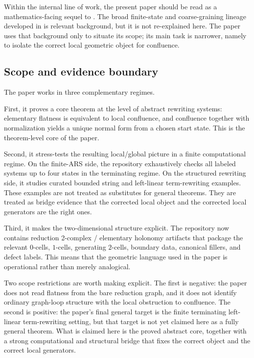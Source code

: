 \documentclass[11pt]{article}
\numberwithin{equation}{section}
\theoremstyle{definition}
\theoremstyle{remark}
\begin{document}
Within the internal line of work, the present paper should be read as a mathematics-facing sequel to \cite{Tsiokos2026CountStone}. The broad finite-state and coarse-graining lineage developed in \cite{Tsiokos2026LayStone} is relevant background, but it is not re-explained here. The paper uses that background only to situate its scope; its main task is narrower, namely to isolate the correct local geometric object for confluence.

\subsection{Scope and evidence boundary}

The paper works in three complementary regimes.

First, it proves a core theorem at the level of abstract rewriting systems: elementary flatness is equivalent to local confluence, and confluence together with normalization yields a unique normal form from a chosen start state. This is the theorem-level core of the paper.

Second, it stress-tests the resulting local/global picture in a finite computational regime. On the finite-ARS side, the repository exhaustively checks all labeled systems up to four states in the terminating regime. On the structured rewriting side, it studies curated bounded string and left-linear term-rewriting examples. These examples are not treated as substitutes for general theorems. They are treated as bridge evidence that the corrected local object and the corrected local generators are the right ones.

Third, it makes the two-dimensional structure explicit. The repository now contains reduction 2-complex / elementary holonomy artifacts that package the relevant $0$-cells, $1$-cells, generating $2$-cells, boundary data, canonical fillers, and defect labels. This means that the geometric language used in the paper is operational rather than merely analogical.

Two scope restrictions are worth making explicit. The first is negative: the paper does not read flatness from the bare reduction graph, and it does not identify ordinary graph-loop structure with the local obstruction to confluence. The second is positive: the paper's final general target is the finite terminating left-linear term-rewriting setting, but that target is not yet claimed here as a fully general theorem. What is claimed here is the proved abstract core, together with a strong computational and structural bridge that fixes the correct object and the correct local generators.
\end{document}
